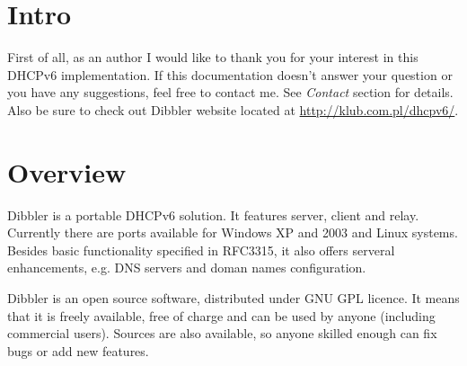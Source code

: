 
\section{Intro}
First of all, as an author I would like to thank you for your interest
in this DHCPv6 implementation. If this documentation doesn't answer
your question or you have any suggestions, feel free to contact
me. See \emph{Contact} section for details. Also be sure to check out
Dibbler website located at \url{http://klub.com.pl/dhcpv6/}.


\section{Overview}

Dibbler is a portable DHCPv6 solution. It features server, client and
relay. Currently there are ports available for Windows XP and 2003
and Linux systems. Besides basic functionality specified in RFC3315,
it also offers serveral enhancements, e.g. DNS servers and doman names
configuration.

Dibbler is an open source software, distributed under GNU GPL
licence. It means that it is freely available, free of charge and can
be used by anyone (including commercial users). Sources are also
available, so anyone skilled enough can fix bugs or add new features.

